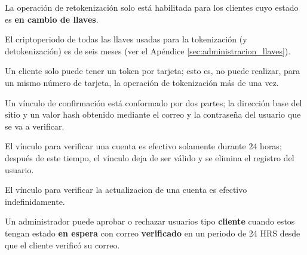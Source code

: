 {
  La operación de retokenización solo está habilitada para los clientes cuyo
  estado es \textbf{en cambio de llaves}.

}

{
  El criptoperiodo de todas las llaves usadas para la tokenización (y
  detokenización) es de seis meses (ver el Apéndice
  \ref{sec:administracion_llaves}).
}

{
  Un cliente solo puede tener un token por tarjeta; esto es, no puede realizar,
  para un mismo número de tarjeta, la operación de tokenización más de una vez.
}

{
  Un vínculo de confirmación está conformado por dos partes; la dirección base
  del sitio y un valor hash obtenido mediante el correo y la contraseña del
  usuario que se va a verificar.
}

{
  El vínculo para verificar una cuenta es efectivo solamente durante
  24 horas; después de este tiempo, el vínculo deja de ser válido y se elimina
  el registro del usuario.
}

{
  El vínculo para verificar la actualizacion de una cuenta es efectivo
  indefinidamente.
}

{
  Un administrador puede aprobar o rechazar usuarios tipo \textbf{cliente}
  cuando estos tengan estado \textbf{en espera} con correo \textbf{verificado}
  en un periodo de 24 HRS desde que el cliente verificó su correo.
}

\newpage
